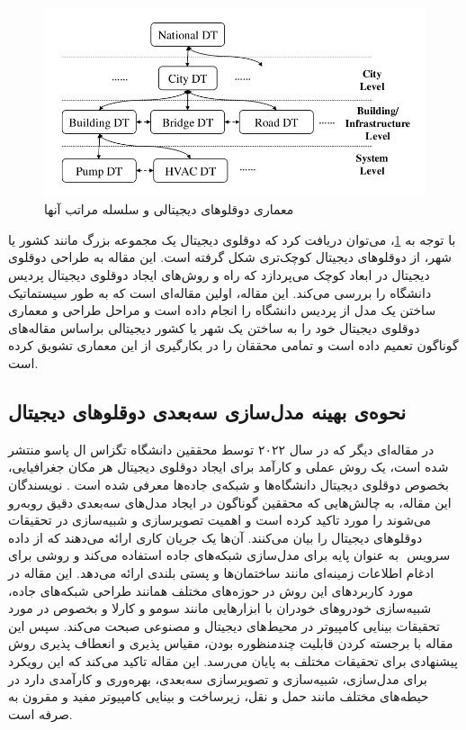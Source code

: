 \begin{figure}[h]
	\centering
	\includegraphics[scale=0.4]{figures/DT connections and hierarchy among different levels.png}
	\caption{  معماری دوقلوهای دیجیتالی و سلسله مراتب آنها \cite{lu2020developing}}
	\label{fig:dt_connections_and_hierarchy}
\end{figure}

با توجه به \cref{fig:dt_connections_and_hierarchy}، می‌توان دریافت کرد که دوقلوی‌ دیجیتال یک مجموعه بزرگ مانند کشور یا شهر، از دوقلو‌های دیجیتال کوچک‌تری شکل گرفته است. این مقاله به طراحی دوقلوی دیجیتال در ابعاد کوچک می‌پردازد که راه و روش‌های ایجاد دوقلوی دیجیتال پردیس دانشگاه را بررسی می‌کند.
این مقاله، اولین مقاله‌ای است که به طور سیستماتیک ساختن یک مدل از پردیس دانشگاه را انجام داده است و مراحل طراحی و معماری دوقلوی دیجیتال خود را به ساختن یک شهر یا کشور دیجیتالی براساس مقاله‌های گوناگون تعمیم داده است و تمامی محققان را در بکارگیری از این معماری تشویق کرده‌ است. 

\subsection{نحوه‌ی بهینه‌ مدل‌سازی سه‌بعدی دوقلوهای دیجیتال}

در مقاله‌‌ای دیگر که در سال ۲۰۲۲ توسط محققین دانشگاه تگزاس ال پاسو منتشر شده است،‌ یک روش عملی و کارآمد برای ایجاد دوقلوی دیجیتال هر مکان جغرافیایی، بخصوص دوقلوی دیجیتال دانشگاه‌ها و شبکه‌ی جاده‌ها معرفی شده است \cite{azfar2022efficient}. نویسندگان این مقاله، به چالش‌هایی که محققین گوناگون در ایجاد مدل‌های سه‌بعدی دقیق روبه‌رو می‌شوند را مورد تاکید کرده است و اهمیت تصویرسازی و شبیه‌سازی در تحقیقات دوقلوهای دیجیتال را بیان می‌کنند. آن‌ها یک جریان کاری ارائه می‌دهند که از داده‌ سرویس ‌ به عنوان پایه برای مدل‌سازی شبکه‌های جاده استفاده می‌کند و روشی برای ادغام اطلاعات زمینه‌ای مانند ساختمان‌ها و پستی بلندی ارائه می‌دهد. این مقاله در مورد کاربرد‌های این روش در حوزه‌های مختلف همانند طراحی شبکه‌های جاده، شبیه‌سازی‌ خودرو‌های خودران با ابزار‌هایی مانند سومو و کارلا و  بخصوص در مورد تحقیقات بینایی کامپیوتر  در محیط‌های دیجیتال و مصنوعی صبحت می‌کند. سپس این مقاله با برجسته کردن قابلیت چند‌منظوره بودن، مقیاس‌ پذیری و انعطاف پذیری روش پیشنهادی برای تحقیقات مختلف به پایان می‌رسد. این مقاله تاکید می‌کند که این رویکرد برای مدل‌سازی، شبیه‌سازی و تصویر‌سازی سه‌بعدی، بهره‌وری و کارآمدی دارد در حیطه‌های مختلف مانند حمل‌ و نقل، زیرساخت و بینایی کامپیوتر مفید و مقرون به صرفه است.

